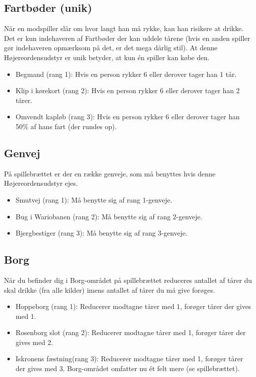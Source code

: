 \documentclass{article}
\begin{document}
\subsection{Fartbøder (unik)}
Når en modspiller slår om hvor langt han må rykke, kan han risikere at drikke. Det er kun indehaveren af Fartbøder der kan uddele tårene (hvis en anden spiller gør indehaveren opmærksom på det, er det mega dårlig stil). At denne Højereordensudstyr er unik betyder, at kun én spiller kan købe den. 
 
\begin{itemize}
	\item Begmand (rang 1): Hvis en person rykker 6 eller derover tager han 1 tår.
	\item Klip i kørekort (rang 2): Hvis en person rykker 6 eller derover tager han 2 tårer.
	\item Omvendt kapløb (rang 3): Hvis en person rykker 6 eller derover tager han 50\% af hans fart (der rundes op).
\end{itemize}

\subsection{Genvej}
På spillebrættet er der en række genveje, som må benyttes hvis denne Højereordensudstyr ejes. 

\begin{itemize}
	\item Smutvej (rang 1): Må benytte sig af rang 1-genveje.
	\item Bug i Wariobanen (rang 2): Må benytte sig af rang 2-genveje.
	\item Bjergbestiger (rang 3): Må benytte sig af rang 3-genveje.
\end{itemize}
 
\subsection{Borg}
Når du befinder dig i Borg-området på spillebrættet reduceres antallet af tårer du skal drikke (fra alle kilder) imens antallet af tårer du må give forøges.

\begin{itemize}
	\item Hoppeborg (rang 1): Reducerer modtagne tårer med 1, forøger tårer der gives med 1.
	\item Rosenborg slot (rang 2): Reducerer modtagne tårer med 1, forøger tårer der gives med 2.
	\item Iskronens fæstning(rang 3): Reducerer modtagne tårer med 1, forøger tårer der gives med 3. Borg-området omfatter nu ét felt mere (se spillebrættet).
\end{itemize}
\end{document}

